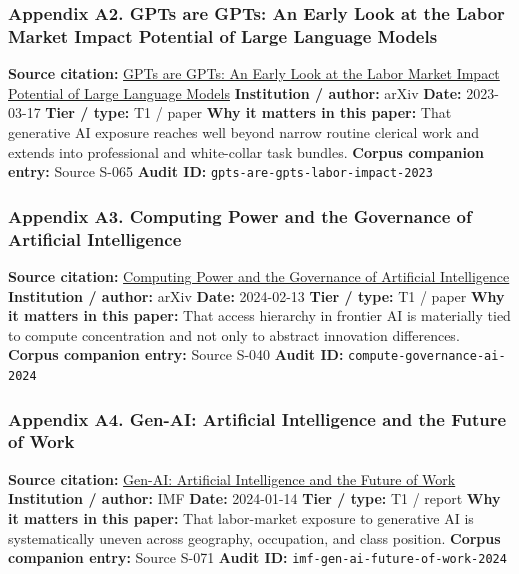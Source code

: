 \documentclass[
  american,
  11pt,
  letterpaper,
]{article}
\begin{document}
\subsubsection{Appendix A2. GPTs are GPTs: An Early Look at the Labor
Market Impact Potential of Large Language
Models}\label{appendix-a2-gpts-are-gpts-an-early-look-at-the-labor-market-impact-potential-of-large-language-models}

\textbf{Source citation:} \href{https://arxiv.org/abs/2303.10130}{GPTs
are GPTs: An Early Look at the Labor Market Impact Potential of Large
Language Models} \textbf{Institution / author:} arXiv \textbf{Date:}
2023-03-17 \textbf{Tier / type:} T1 / paper \textbf{Why it matters in
this paper:} That generative AI exposure reaches well beyond narrow
routine clerical work and extends into professional and white-collar
task bundles. \textbf{Corpus companion entry:} Source S-065
\textbf{Audit ID:} \texttt{gpts-are-gpts-labor-impact-2023}

\subsubsection{Appendix A3. Computing Power and the Governance of
Artificial
Intelligence}\label{appendix-a3-computing-power-and-the-governance-of-artificial-intelligence}

\textbf{Source citation:}
\href{https://arxiv.org/abs/2402.08797}{Computing Power and the
Governance of Artificial Intelligence} \textbf{Institution / author:}
arXiv \textbf{Date:} 2024-02-13 \textbf{Tier / type:} T1 / paper
\textbf{Why it matters in this paper:} That access hierarchy in frontier
AI is materially tied to compute concentration and not only to abstract
innovation differences. \textbf{Corpus companion entry:} Source S-040
\textbf{Audit ID:} \texttt{compute-governance-ai-2024}

\subsubsection{Appendix A4. Gen-AI: Artificial Intelligence and the
Future of
Work}\label{appendix-a4-gen-ai-artificial-intelligence-and-the-future-of-work}

\textbf{Source citation:}
\href{https://www.imf.org/en/publications/staff-discussion-notes/issues/2024/01/14/gen-ai-artificial-intelligence-and-the-future-of-work-542379}{Gen-AI:
Artificial Intelligence and the Future of Work} \textbf{Institution /
author:} IMF \textbf{Date:} 2024-01-14 \textbf{Tier / type:} T1 / report
\textbf{Why it matters in this paper:} That labor-market exposure to
generative AI is systematically uneven across geography, occupation, and
class position. \textbf{Corpus companion entry:} Source S-071
\textbf{Audit ID:} \texttt{imf-gen-ai-future-of-work-2024}
\end{document}
